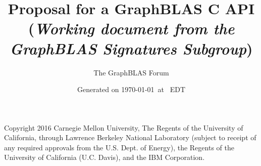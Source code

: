 \documentclass[11pt]{extarticle}
\begin{document}
\linenumbers

\title{Proposal for a GraphBLAS C API\\ (\emph{\large Working document from the \emph{GraphBLAS} Signatures Subgroup})}
\author{The GraphBLAS Forum}
\date{Generated on \today\ at \currenttime\ EDT}

\renewcommand{\vector}[1]{{\bf #1}}
\renewcommand{\matrix}[1]{{\bf #1}}
\newcommand{\zip}{{\mbox{zip}}}
\newcommand{\zap}{{\mbox{zap}}}
\newcommand{\ewiseadd}{{\mbox{\bf ewiseadd}}}
\newcommand{\ewisemult}{{\mbox{\bf ewisemult}}}
\newcommand{\mxm}{{\mbox{\bf mxm}}}
\newcommand{\vxm}{{\mbox{\bf vxm}}}
\newcommand{\mxv}{{\mbox{\bf mxv}}}
\newcommand{\gpit}[1]{{\sf #1}}
\newcommand{\ie}{\emph{i.e.}}
\newcommand{\eg}{\emph{e.g.}}
\newcommand{\nan}{{\sf NaN}}
\newcommand{\nil}{{\bf nil}}
\newcommand{\ifif}{{\bf if}}
\newcommand{\ifthen}{{\bf then}}
\newcommand{\ifelse}{{\bf else}}
\newcommand{\ifendif}{{\bf endif}}
\newcommand{\zero}{{\bf 0}}
\newcommand{\one}{{\bf 1}}


\newcommand{\aydin}[1]{{{\color{orange}[Aydin: #1]}}}
\newcommand{\scott}[1]{{{\color{violet}[Scott: #1]}}}
\newcommand{\tim}[1]{{{\color{teal}[Tim: #1]}}}
\newcommand{\jose}[1]{{{\color{red}[Jose: #1]}}}
\newcommand{\carl}[1]{{{\color{blue}[Carl: #1]}}}
\newcommand{\ajy}[1]{{{\color{brown}[Yzelman: #1]}}}

\renewcommand{\aydin}[1]{{{\color{orange}}}}
\renewcommand{\scott}[1]{{{\color{violet}}}}
\renewcommand{\tim}[1]{{{\color{teal}}}}
\renewcommand{\jose}[1]{{{\color{red}}}}
\renewcommand{\carl}[1]{{{\color{blue}}}}
\renewcommand{\ajy}[1]{{{\color{brown}}}}

\renewcommand{\comment}[1]{{}}

\setlength{\parskip}{0.5\baselineskip}
\setlength{\parindent}{0ex}

\maketitle

\vfill

Copyright 2016 Carnegie Mellon University, The Regents of the University of California, through Lawrence Berkeley National Laboratory (subject to receipt of any required approvals from the U.S. Dept. of Energy), the Regents of the University of California (U.C. Davis), and the IBM Corporation. \scott{Need to add Intel Corporation when Tim Mattson returns from walkabout.}
\end{document}
